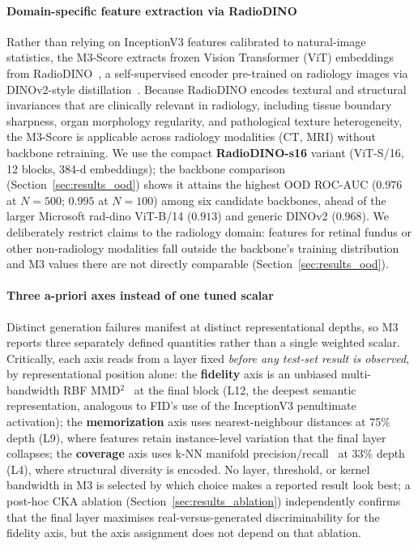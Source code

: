 \documentclass[lettersize,journal]{IEEEtran}
\begin{document}
\paragraph{Domain-specific feature extraction via RadioDINO}
Rather than relying on InceptionV3 features calibrated to
natural-image statistics, the M3-Score extracts frozen Vision Transformer (ViT) embeddings from RadioDINO~\cite{perezrad}, a self-supervised encoder pre-trained on radiology images via DINOv2-style distillation~\cite{oquab2023dinov2}. Because RadioDINO encodes textural and structural invariances that are clinically relevant in radiology, including tissue boundary sharpness, organ morphology regularity, and pathological texture heterogeneity, the M3-Score is applicable across radiology modalities (CT, MRI) without backbone retraining. We use the compact \textbf{RadioDINO-s16} variant (ViT-S/16, 12 blocks, 384-d embeddings); the backbone comparison (Section~\ref{sec:results_ood}) shows it attains the highest OOD ROC-AUC ($0.976$ at $N{=}500$; $0.995$ at $N{=}100$) among six candidate backbones, ahead of the larger Microsoft rad-dino ViT-B/14 ($0.913$) and generic DINOv2 ($0.968$). We deliberately restrict claims to the radiology domain: features for retinal fundus or other non-radiology modalities fall outside the backbone's training distribution and M3 values there are not directly comparable (Section~\ref{sec:results_ood}).

\paragraph{Three a-priori axes instead of one tuned scalar}
Distinct generation failures manifest at distinct representational depths, so M3 reports three separately defined quantities rather than a single weighted scalar. Critically, each axis reads from a layer fixed \emph{before any test-set result is observed}, by representational position alone:
the \textbf{fidelity} axis is an unbiased multi-bandwidth RBF MMD\(^2\)~\cite{gretton2012kernel} at the final block (L12, the deepest semantic representation, analogous to FID's use of the InceptionV3 penultimate activation);
the \textbf{memorization} axis uses nearest-neighbour distances at 75\% depth (L9), where features retain instance-level variation that the final layer collapses;
the \textbf{coverage} axis uses k-NN manifold precision/recall~\cite{kynkaanniemi2019pr} at 33\% depth (L4), where structural diversity is encoded. No layer, threshold, or kernel bandwidth in M3 is selected by which choice makes a reported result look best; a post-hoc CKA ablation (Section~\ref{sec:results_ablation}) independently confirms that the final layer maximises real-versus-generated discriminability for the fidelity axis, but the axis assignment does not depend on that ablation.
\end{document}

